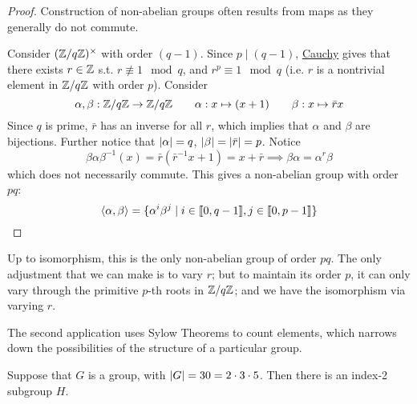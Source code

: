 \begin{proof}
    Construction of non-abelian groups often results from maps as they generally do not commute.

    Consider $(\mathbb{Z}/q\mathbb{Z})^{\times}$ with order $(q - 1)$. Since $p \mid (q-1)$, \hyperref[thm: Cauchy]{Cauchy} gives that there exists $r \in \mathbb{Z}$ s.t. $r \nequiv 1 \mod{q}$, and $r^p \equiv 1 \mod{q}$ (i.e. $r$ is a nontrivial element in $\mathbb{Z}/q\mathbb{Z}$ with order $p$). Consider
    \[
        \alpha, \beta : \mathbb{Z}/q\mathbb{Z} \to \mathbb{Z}/q\mathbb{Z} \qquad \alpha: x \mapsto (x + 1) \qquad \beta: x \mapsto \bar{r} x
    \]
    Since $q$ is prime, $\bar{r}$ has an inverse for all $r$, which implies that $\alpha$ and $\beta$ are bijections. Further notice that $\left|\alpha\right| = q$, $\left|\beta\right| = \left|\bar{r}\right| = p$. Notice
    \[
        \beta \alpha \beta^{-1}(x) = \bar{r}(\bar{r}^{-1}x + 1) = x + \bar{r} \implies \beta \alpha = \alpha^r \beta
    \]
    which does not necessarily commute. This gives a non-abelian group with order $pq$:
    \[
        \left\langle \alpha, \beta \right\rangle = \{\alpha^i \beta^j \mid i \in \llbracket 0, q-1 \rrbracket, j \in \llbracket 0, p-1 \rrbracket\}
    \]
\end{proof}

\begin{remark}
    Up to isomorphism, this is the only non-abelian group of order $pq$. The only adjustment that we can make is to vary $r$; but to maintain its order $p$, it can only vary through the primitive $p$-th roots in $\mathbb{Z}/q\mathbb{Z}$; and we have the isomorphism via varying $r$.
\end{remark}

\textstart
The second application uses Sylow Theorems to count elements, which narrows down the possibilities of the structure of a particular group.

\begin{proposition}\label{prop: gp of order 30 has index-2 subgp}
    Suppose that $G$ is a group, with $\left|G\right| = 30 = 2 \cdot 3 \cdot 5$. Then there is an index-2 subgroup $H$.
\end{proposition}

